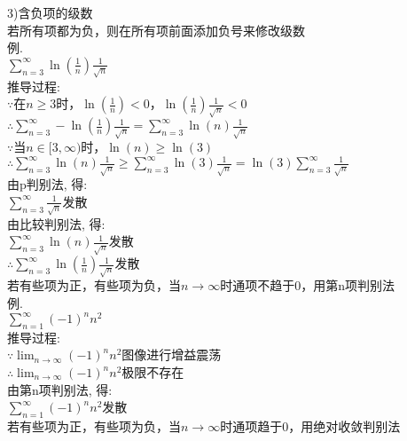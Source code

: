 3)含负项的级数\\
若所有项都为负，则在所有项前面添加负号来修改级数\\
例.\\
\phantom{例}$\displaystyle\sum_{n=3}^{\infty}\ln(\frac{1}{n})\frac{1}{\sqrt{n}}$\\[1ex]
推导过程:\\
$\because$在$n\geqslant 3$时，$\ln(\frac{1}{n})<0$，$\ln(\frac{1}{n})\frac{1}{\sqrt{n}}<0$\\
$\therefore\displaystyle\sum_{n=3}^{\infty}-\ln(\frac{1}{n})\frac{1}{\sqrt{n}}=\sum_{n=3}^{\infty}\ln(n)\frac{1}{\sqrt{n}}$\\
$\because$当$n\in[3,\infty)$时，$\ln(n)\geqslant\ln(3)$\\
$\therefore\displaystyle\sum_{n=3}^{\infty}\ln(n)\frac{1}{\sqrt{n}}\geqslant\sum_{n=3}^{\infty}\ln(3)\frac{1}{\sqrt{n}}=\ln(3)\sum_{n=3}^{\infty}\frac{1}{\sqrt{n}}$\\
由p判别法, 得:\\
$\displaystyle\sum_{n=3}^\infty\frac{1}{\sqrt{n}}$发散\\
由比较判别法, 得:\\
$\displaystyle\sum_{n=3}^\infty\ln(n)\frac{1}{\sqrt{n}}$发散\\
$\therefore\displaystyle\sum_{n=3}^{\infty}\ln(\frac{1}{n})\frac{1}{\sqrt{n}}$发散\\[2ex]

若有些项为正，有些项为负，当$n\to\infty$时通项不趋于$0$，用第n项判别法\\
例.\\
\phantom{例}$\displaystyle\sum_{n=1}^{\infty}(-1)^nn^2$\\[1ex]
推导过程:\\
$\displaystyle\because\lim_{n\to\infty}(-1)^nn^2$图像进行增益震荡\\
$\displaystyle\therefore\lim_{n\to\infty}(-1)^nn^2$极限不存在\\
由第n项判别法, 得:\\
$\displaystyle\sum_{n=1}^{\infty}(-1)^nn^2$发散\\[2ex]

若有些项为正，有些项为负，当$n\to\infty$时通项趋于0，用绝对收敛判别法
\begin{center}
\end{center}

